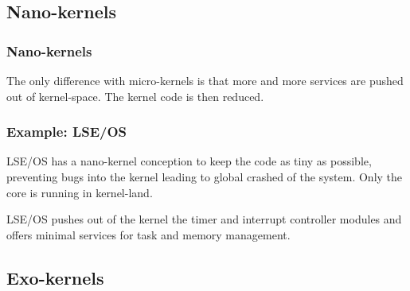 %
%

\subsection{Nano-kernels}

%
%

\begin{frame}
  \frametitle{Nano-kernels}

  The only difference with micro-kernels is that more and more
  services are pushed out of kernel-space. The kernel code is then
  reduced.

\end{frame}

%
%

\begin{frame}
  \frametitle{Example: LSE/OS}

  LSE/OS has a nano-kernel conception to keep the code as tiny as
  possible, preventing bugs into the kernel leading to global crashed
  of the system. Only the core is running in kernel-land.

  \begin{center}
  \end{center}

  LSE/OS pushes out of the kernel the timer and interrupt controller
  modules and offers minimal services for task and memory management.

\end{frame}

%
%

\subsection{Exo-kernels}

%
%

